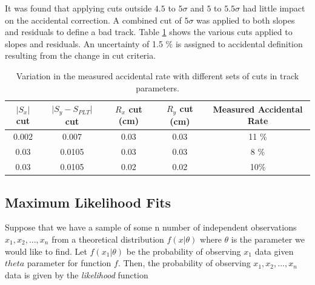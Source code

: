 It was found that applying cuts outside $4.5$ to $5 \sigma$ and $5$ to $5.5 \sigma$ had little impact on the accidental correction. A combined cut of $5 \sigma$ was applied to both slopes and residuals to define a bad track. Table \ref{tbl:accCorr} shows the various cuts applied to slopes and residuals. An uncertainty of 1.5 \% is assigned to accidental definition resulting from the change in cut criteria.

\begin{table}[htp]
\begin{center}
    \captionsetup{format=hang}
\caption{Variation in the measured accidental rate with different sets of cuts in track parameters.}
\begin{tabular}{| c | c | c | c | c |}
\hline
$\vert S_{x} \vert$ cut & $\vert S_{y} - S_{PLT} \vert $ cut & $R_{x}$ cut (cm) & $R_{y}$ cut (cm) & Measured Accidental Rate \\ \hline
0.002 & 0.007 & 0.03 & 0.03 & 11 \% \\ \hline
0.03 & 0.0105 & 0.03 & 0.03 & 8 \% \\ \hline
0.03 & 0.0105 & 0.02 & 0.02 & 10\% \\ \hline
\end{tabular}
\end{center}
\label{tbl:accCorr}
\end{table}%





\subsection{Maximum Likelihood Fits} \label{sec:mlfit}

Suppose that we have a sample of some n number of independent observations $x_{1}, x_{2}, ..., x_{n}$ from a theoretical distribution $f(x | \theta)$ where $\theta$ is the parameter we would like to find. Let $f(x_{1} | \theta)$ be the probability of observing $x_{1}$ data given $theta$ parameter for function $f$. Then, the probability of observing $x_{1}, x_{2},...,x_{n}$ data is given by the \emph{likelihood} function

